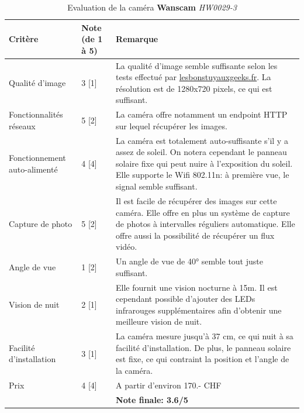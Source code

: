 \begin{table}[H]
    \centering
    \caption{Evaluation de la caméra \textbf{Wanscam} \textit{HW0029-3}}
    \label{cam:wan3_eval}
    \begin{tabular}{@{}llp{8cm}@{}}
        \toprule
        Critère                              & Note (de 1 à 5) & Remarque                                                                                                                                                                   \\ \midrule
        Qualité d'image              & 3 [1]               & La qualité d'image semble suffisante selon les tests effectué par \url{lesbonstuyauxgeeks.fr}\autocite{cam:wan3-test}. La résolution est de 1280x720 pixels, ce qui est suffisant. \\ [0.8ex]
        Fonctionnalités réseaux      & 5 [2]              & La caméra offre notamment un endpoint HTTP sur lequel récupérer les images.                                                                                                \\ [0.8ex]
        Fonctionnement auto-alimenté & 4 [4]              & La caméra est totalement auto-suffisante s'il y a assez de soleil. On notera cependant le panneau solaire fixe qui peut nuire à l'exposition du soleil. Elle supporte le Wifi 802.11n: à première vue, le signal semble suffisant.                   \\ [0.8ex]
        Capture de photo             & 5 [2]              & Il est facile de récupérer des images sur cette caméra. Elle offre en plus un système de capture de photos à intervalles réguliers automatique. Elle offre aussi la possibilité de récupérer un flux vidéo.                            \\ [0.8ex]
        Angle de vue                 & 1 [2]              & Un angle de vue de 40° semble tout juste suffisant.                                                                                                                        \\ [0.8ex]
        Vision de nuit               & 2 [1]               & Elle fournit une vision nocturne à 15m. Il est cependant possible d'ajouter des LEDs infrarouges supplémentaires afin d'obtenir une meilleure vision de nuit\autocite{cam:wan3-url}. \\ [0.8ex]
        Facilité d'installation      & 3 [1]              & La caméra mesure jusqu'à 37 cm, ce qui nuit à sa facilité d'installation. De plus, le panneau solaire est fixe, ce qui contraint la position et l'angle de la caméra.      \\ [0.8ex]
        Prix                         & 4 [4]              & A partir d'environ 170.- CHF \\ \midrule
        && \textbf{Note finale: 3.6/5} \\ \bottomrule
    \end{tabular}
\end{table}

